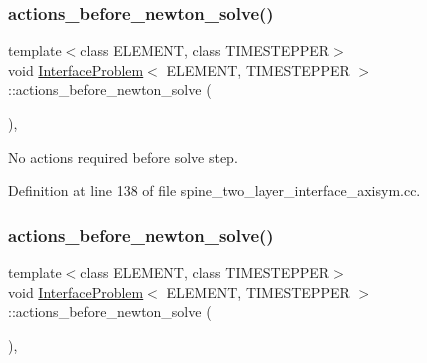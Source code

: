 \subsubsection{\texorpdfstring{actions\+\_\+before\+\_\+newton\+\_\+solve()}{actions\_before\_newton\_solve()}\hspace{0.1cm}{\footnotesize\ttfamily [1/2]}}
{\footnotesize\ttfamily template$<$class E\+L\+E\+M\+E\+NT, class T\+I\+M\+E\+S\+T\+E\+P\+P\+ER$>$ \\
void \hyperlink{classInterfaceProblem}{Interface\+Problem}$<$ E\+L\+E\+M\+E\+NT, T\+I\+M\+E\+S\+T\+E\+P\+P\+ER $>$\+::actions\+\_\+before\+\_\+newton\+\_\+solve (\begin{DoxyParamCaption}{ }\end{DoxyParamCaption})\hspace{0.3cm}{\ttfamily [inline]}, {\ttfamily [private]}}



No actions required before solve step. 



Definition at line 138 of file spine\+\_\+two\+\_\+layer\+\_\+interface\+\_\+axisym.\+cc.

\mbox{\label{classInterfaceProblem_ade63c8a74f666edf530460b989968b4f}} 
\subsubsection{\texorpdfstring{actions\+\_\+before\+\_\+newton\+\_\+solve()}{actions\_before\_newton\_solve()}\hspace{0.1cm}{\footnotesize\ttfamily [2/2]}}
{\footnotesize\ttfamily template$<$class E\+L\+E\+M\+E\+NT, class T\+I\+M\+E\+S\+T\+E\+P\+P\+ER$>$ \\
void \hyperlink{classInterfaceProblem}{Interface\+Problem}$<$ E\+L\+E\+M\+E\+NT, T\+I\+M\+E\+S\+T\+E\+P\+P\+ER $>$\+::actions\+\_\+before\+\_\+newton\+\_\+solve (\begin{DoxyParamCaption}{ }\end{DoxyParamCaption})\hspace{0.3cm}{\ttfamily [inline]}, {\ttfamily [private]}}



